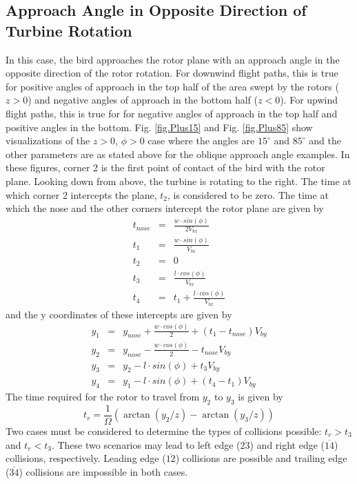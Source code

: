 \label{} \documentclass[10pt,conference]{IEEEtran}
\begin{document}
\subsection{Approach Angle in Opposite Direction of Turbine Rotation}
In this case, the bird approaches the rotor plane with an approach angle in the opposite direction of the rotor
rotation. For downwind flight paths, this is true for positive angles of approach in the top half of the area swept by
the rotors ($z>0$) and negative angles of approach in the bottom half ($z<0$). For upwind flight paths, this is true
for for negative angles of approach in the top half and positive angles in the bottom. Fig. \ref{fig.Plus15} and Fig.
\ref{fig.Plus85} show visualizations of the $z>0$, $\phi>0$ case where the angles are $15^\circ$ and $85^\circ$ and the
other parameters are as stated above for the oblique approach angle examples. In these figures, corner 2 is the first
point of contact of the bird with the rotor plane. Looking down from above, the turbine is rotating to the right. The
time at which corner 2 intercepts the plane, $t_2$, is considered to be zero. The time at which the nose and the other
corners intercept the rotor plane are given by
\begin{eqnarray*}
    t_{nose} &=& \frac{w \cdot sin(\phi)}{2 V_{bx}}\\
    t_1 &=& \frac{w \cdot sin(\phi)}{V_{bx}}\\
    t_2 &=& 0\\
    t_3 &=& \frac{l \cdot cos(\phi)}{V_{bx}}\\
    t_4 &=& t_1 + \frac{l \cdot cos(\phi)}{V_{bx}}
\end{eqnarray*}
and the y coordinates of these intercepts are given by
\begin{eqnarray*}
    y_1 &=& y_{nose}+\frac{w \cdot cos(\phi)}{2}+(t_1-t_{nose})V_{by}\\
    y_2 &=& y_{nose}-\frac{w \cdot cos(\phi)}{2}-t_{nose}V_{by}\\
    y_3 &=& y_2-l \cdot sin(\phi) + t_3V_{by}\\
    y_4 &=& y_1-l \cdot sin(\phi) + (t_4-t_1)V_{by}
\end{eqnarray*}
The time required for the rotor to travel from $y_2$ to $y_3$ is given by
\begin{equation*}
    t_r = \frac{1}{\Omega}(\arctan(y_2/z)-\arctan(y_3/z))
\end{equation*}
Two cases must be considered to determine the types of collisions possible: $t_r>t_3$ and $t_r<t_3$. These two
scenarios may lead to left edge ($\overline{23}$) and right edge ($\overline{14}$) collisions, respectively. Leading
edge ($\overline{12}$) collisions are possible and trailing edge ($\overline{34}$) collisions are impossible in both
cases.
\end{document}
